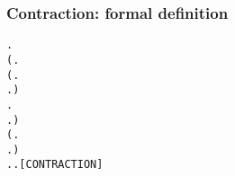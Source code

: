 \begin{frame}[fragile]
\frametitle{Contraction: formal definition}
\begin{scriptsize}
\begin{alltt}
\HOLTokenTurnstile{}   \HOLSymConst{\HOLTokenEquiv{}}
   \HOLSymConst{\HOLTokenForall{}} .
          \HOLSymConst{\HOLTokenImp{}}
       (\HOLSymConst{\HOLTokenForall{}}.
            (\HOLSymConst{\HOLTokenForall{}}.
                  \HOLTokenTransBegin{} \HOLTokenTransEnd {} \HOLSymConst{\HOLTokenImp{}}
                 \HOLSymConst{\HOLTokenExists{}}.  \HOLTokenTransBegin{} \HOLTokenTransEnd {} \HOLSymConst{\HOLTokenConj{}}   ) \HOLSymConst{\HOLTokenConj{}}
            \HOLSymConst{\HOLTokenForall{}}.
                 \HOLTokenTransBegin{} \HOLTokenTransEnd {} \HOLSymConst{\HOLTokenImp{}} \HOLSymConst{\HOLTokenExists{}}.  \HOLTokenWeakTransBegin{} \HOLTokenWeakTransEnd {} \HOLSymConst{\HOLTokenConj{}}  \HOLSymConst{\HOLTokenWeakEQ} ) \HOLSymConst{\HOLTokenConj{}}
       (\HOLSymConst{\HOLTokenForall{}}.
             \HOLTokenTransBegin\HOLSymConst{\ensuremath{\tau}}\HOLTokenTransEnd {} \HOLSymConst{\HOLTokenImp{}}    \HOLSymConst{\HOLTokenDisj{}} \HOLSymConst{\HOLTokenExists{}}.  \HOLTokenTransBegin\HOLSymConst{\ensuremath{\tau}}\HOLTokenTransEnd {} \HOLSymConst{\HOLTokenConj{}}   ) \HOLSymConst{\HOLTokenConj{}}
       \HOLSymConst{\HOLTokenForall{}}.  \HOLTokenTransBegin\HOLSymConst{\ensuremath{\tau}}\HOLTokenTransEnd {} \HOLSymConst{\HOLTokenImp{}} \HOLSymConst{\HOLTokenExists{}}.  \HOLSymConst{\HOLTokenEPS}  \HOLSymConst{\HOLTokenConj{}}  \HOLSymConst{\HOLTokenWeakEQ} \hfill{[CONTRACTION]}
\end{alltt}


\end{scriptsize}
\end{frame}
